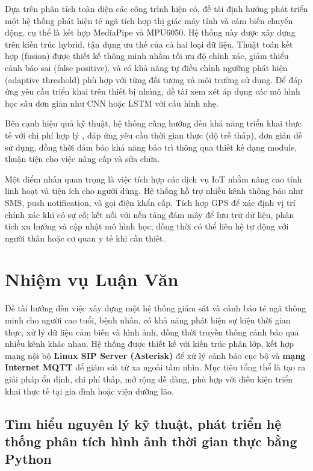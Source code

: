 Dựa trên phân tích toàn diện các công trình hiện có, đề tài định hướng phát triển một hệ thống phát hiện té ngã tích hợp thị giác máy tính và cảm biến chuyển động, cụ thể là kết hợp MediaPipe và MPU6050. Hệ thống này được xây dựng trên kiến trúc hybrid, tận dụng ưu thế của cả hai loại dữ liệu. Thuật toán kết hợp (fusion) được thiết kế thông minh nhằm tối ưu độ chính xác, giảm thiểu cảnh báo sai (false positive), và có khả năng tự điều chỉnh ngưỡng phát hiện (adaptive threshold) phù hợp với từng đối tượng và môi trường sử dụng. Để đáp ứng yêu cầu triển khai trên thiết bị nhúng, đề tài xem xét áp dụng các mô hình học sâu đơn giản như CNN hoặc LSTM với cấu hình nhẹ.

Bên cạnh hiệu quả kỹ thuật, hệ thống cũng hướng đến khả năng triển khai thực tế với chi phí hợp lý , đáp ứng yêu cầu thời gian thực (độ trễ thấp), đơn giản dễ sử dụng, đồng thời đảm bảo khả năng bảo trì thông qua thiết kế dạng module, thuận tiện cho việc nâng cấp và sửa chữa.

Một điểm nhấn quan trọng là việc tích hợp các dịch vụ IoT nhằm nâng cao tính linh hoạt và tiện ích cho người dùng. Hệ thống hỗ trợ nhiều kênh thông báo như SMS, push notification, và gọi điện khẩn cấp. Tích hợp GPS để xác định vị trí chính xác khi có sự cố; kết nối với nền tảng đám mây để lưu trữ dữ liệu, phân tích xu hướng và cập nhật mô hình học; đồng thời có thể liên hệ tự động với người thân hoặc cơ quan y tế khi cần thiết.


\section{Nhiệm vụ Luận Văn}

Đề tài hướng đến việc xây dựng một hệ thống giám sát và cảnh báo té ngã thông minh cho người cao tuổi, bệnh nhân, có khả năng phát hiện sự kiện thời gian thực, xử lý dữ liệu cảm biến và hình ảnh, đồng thời truyền thông cảnh báo qua nhiều kênh khác nhau. Hệ thống được thiết kế với kiến trúc phân lớp, kết hợp mạng nội bộ  \textbf{Linux SIP Server (Asterisk)} để xử lý cảnh báo cục bộ và \textbf{mạng Internet MQTT} để giám sát từ xa ngoài tầm nhìn. Mục tiêu tổng thể là tạo ra giải pháp ổn định, chi phí thấp, mở rộng dễ dàng, phù hợp với điều kiện triển khai thực tế tại gia đình hoặc viện dưỡng lão.

\subsection{Tìm hiểu nguyên lý kỹ thuật, phát triển hệ thống phân tích hình ảnh thời gian thực bằng Python}

